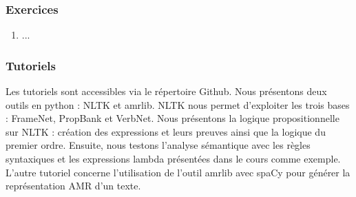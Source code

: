\documentclass{KodeBook}
\begin{document}

\subsubsection*{Exercices}

\begin{enumerate}
	\item ...
	
\end{enumerate}

\subsubsection*{Tutoriels}

Les tutoriels sont accessibles via le répertoire Github.
Nous présentons deux outils en python : NLTK et amrlib.
NLTK nous permet d'exploiter les trois bases : FrameNet, PropBank et VerbNet.
Nous présentons la logique propositionnelle sur NLTK : création des expressions et leurs preuves ainsi que la logique du premier ordre.
Ensuite, nous testons l'analyse sémantique avec les règles syntaxiques et les expressions lambda présentées dans le cours comme exemple.
L'autre tutoriel concerne l'utilisation de l'outil amrlib avec spaCy pour générer la représentation AMR d'un texte.



\ifx\wholebook\relax\else
% 
% 
	
\end{document}
